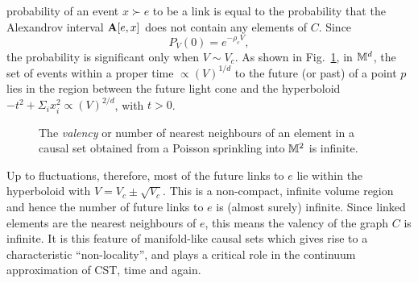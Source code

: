  probability of an event $x \succ e $ to 
be a link is equal to the probability that the Alexandrov interval $\mathbf A[e,x]$ does not contain any
elements of $C$. Since 
\begin{equation} 
P_V(0)=e^{-\rho_c V},  
\end{equation}  
the probability is significant only when $V \sim V_c$. As shown in  Fig.~\ref{valency.fig}, in  $\mathbb M^d$, the set of events within a
proper time $\propto (V)^{1/d}$ to the future (or past) of a point $p$ lies in the region between the future light cone and the
hyperboloid $-t^2+\Sigma_i x_i^2 \propto (V)^{2/d}$, with $t>0$. 
\begin{figure}[ht]
\caption{The \emph{valency} or number of nearest neighbours  of an element in a causal set obtained from a Poisson sprinkling into $\mathbb M^2$ is infinite.}
\label{valency.fig}
\end{figure}
Up to fluctuations, therefore,  most of the future links to $e$ lie within the hyperboloid with $V=V_c \pm \sqrt{V_c}$. This is a  non-compact, infinite volume
region and hence the number of future links to $e$ is (almost surely) infinite.   Since linked elements  are the nearest
neighbours of $e$, this means the valency of 
 the graph $C$ is infinite. It is this feature of manifold-like causal sets which gives rise to a characteristic  
``non-locality'',  and   plays a critical  role in the continuum approximation of CST, time and again.

